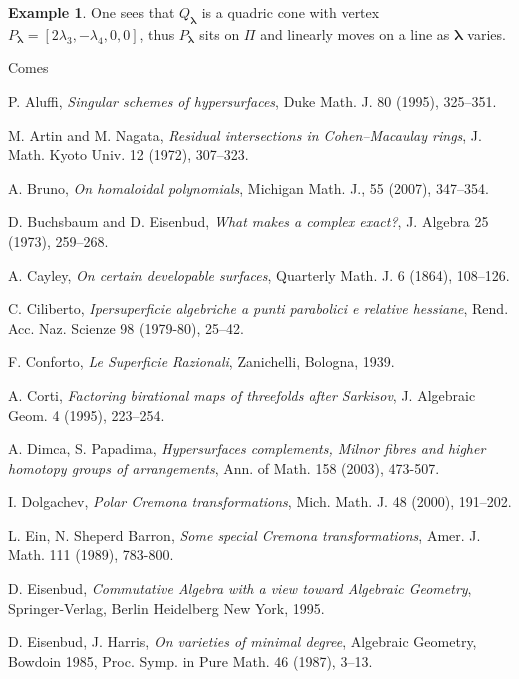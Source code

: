 \documentclass[11pt]{article}   %
\theoremstyle{definition}
\newtheorem{Example}[Theorem]{Example}
\numberwithin{Theorem}{section} \numberwithin{equation}{section}
\begin{document}
{{\begin{Example}
\noindent One sees that $Q_\mathbf{\lambda}$ is a quadric cone with
vertex $P_\mathbf{\lambda}=[2\lambda_3,-\lambda_4,0,0]$, thus
$P_\mathbf{\lambda}$ sits on $\Pi$ and linearly moves on a line as
$\mathbf{\lambda}$ varies.
\end{Example}




\begin{thebibliography}{Comes}


 P. Aluffi, {\it Singular schemes of
hypersurfaces}, Duke Math. J. 80 (1995), 325--351.

 M. Artin and M. Nagata, {\em Residual intersections in
Cohen--Macaulay rings}, J. Math. Kyoto Univ.  12 (1972), 307--323.

 A. Bruno, {\it On homaloidal polynomials},
Michigan Math. J.,  55 (2007), 347--354.

 D. Buchsbaum and D. Eisenbud, {\it What makes a complex
exact?}, J. Algebra 25 (1973),  259--268.


 A. Cayley, {\it On certain developable surfaces},
Quarterly Math. J.  6 (1864), 108--126.


 C. Ciliberto, {\it Ipersuperficie algebriche a punti parabolici
e relative hessiane}, Rend. Acc. Naz. Scienze  98 (1979-80),
25--42.

 F. Conforto, {\it  Le Superficie Razionali}, Zanichelli,
Bologna, 1939.

 A. Corti, {\it Factoring birational maps of threefolds after Sarkisov},
J. Algebraic Geom.   4  (1995),  223--254.

 A. Dimca, S. Papadima, {\it  Hypersurfaces complements,
Milnor fibres and higher homotopy groups of arrangements}, Ann. of Math. 158 (2003), 473-507.


 I. Dolgachev, {\it Polar Cremona transformations}, Mich. Math. J.
 48 (2000), 191--202.


 L. Ein, N. Sheperd Barron, {\it Some special Cremona
transformations}, Amer. J. Math.
 111 (1989), 783-800.

 D. Eisenbud, {\it Commutative Algebra with a
view toward Algebraic Geometry}, Springer-Verlag, Berlin Heidelberg
New York, 1995.

 D. Eisenbud, J. Harris,
{\it On varieties of minimal degree}, Algebraic Geometry, Bowdoin 1985,
Proc. Symp. in Pure Math.  46 (1987), 3--13.



\end{thebibliography}}}
\end{document}
